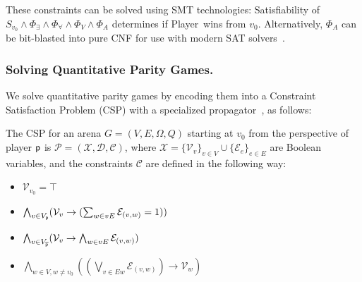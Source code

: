 \documentclass[runningheads]{llncs}
\begin{document}
These constraints can be solved using SMT technologies: Satisfiability of $S_{v_0} \wedge \Phi_\exists \wedge \Phi_\forall \wedge \Phi_V \wedge \Phi_A$ determines if Player~\even wins from $v_0$. Alternatively, $\Phi_A$ can be bit-blasted into pure CNF for use with modern SAT solvers~\cite{Heljanko:2012}.

\subsubsection{Solving Quantitative Parity Games.}
We solve quantitative parity games by encoding them into a Constraint Satisfaction Problem (CSP) with a specialized propagator~\cite{Hernandez:2026:noc}, as follows: 

\begin{definition}\label{def:csp}
    The CSP for an arena $G=(V,E, \Omega, Q)$ starting at $v_0$ from the perspective of player $\mathsf{p}$ is $\mathcal{P} = (\mathcal{X}, \mathcal{D}, \mathcal{C})$, where $\mathcal{X} = \{ \mathcal{V}_v \}_{v \in V} \cup \{ \mathcal{E}_e \}_{e \in E}$ are Boolean variables, and the constraints $\mathcal{C}$ are defined in the following way:
    \begin{itemize}[leftmargin=2.1cm, labelwidth=1.7cm, align=left, itemsep=1.0ex, parsep=0pt]

        \item [$\mathcal{C}_{v_0}$ :] $\mathcal{V}_{v_0} = \top$

        \item [$\mathcal{C}_{\player}$ :] $\bigwedge_{v \in V_{\mathsf{p}}} (\mathcal{V}_v \rightarrow (\sum_{w \in vE} \mathcal{E}_{(v,w)}= 1))$

        \item [$\mathcal{C}_{\opponent}$ :] $\bigwedge_{v \in V_{\overline{\mathsf{p}}}} (\mathcal{V}_v \rightarrow \bigwedge_{w \in vE} \mathcal{E}_{(v,w)})$

        \item [$\mathcal{C}_{\!E}$ :] $\bigwedge_{w \in V, w \neq v_0} ((\bigvee_{v \in Ew} \mathcal{E}_{(v,w)}) \rightarrow \mathcal{V}_w)$

        
        

\end{itemize}
\end{definition}
\end{document}
